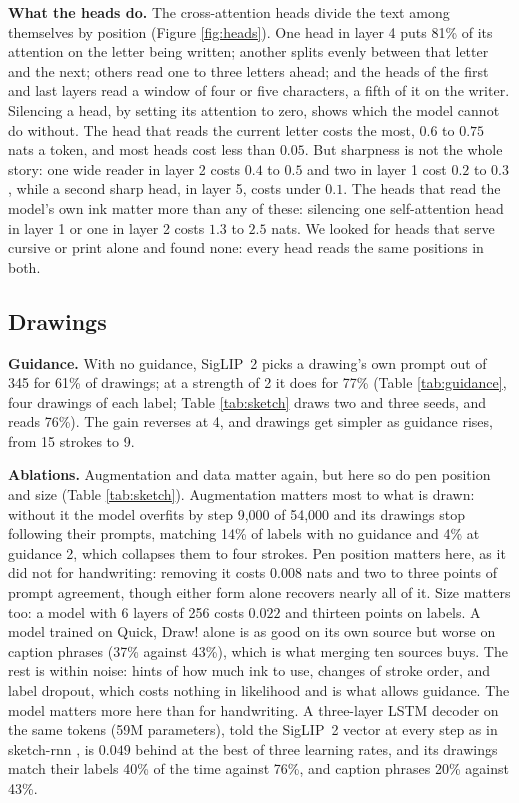 \documentclass{article}
\begin{document}
\textbf{What the heads do.} The cross-attention heads divide the text among themselves by position (Figure \ref{fig:heads}). One head in layer 4 puts 81\% of its attention on the letter being written; another splits evenly between that letter and the next; others read one to three letters ahead; and the heads of the first and last layers read a window of four or five characters, a fifth of it on the writer. Silencing a head, by setting its attention to zero, shows which the model cannot do without. The head that reads the current letter costs the most, $0.6$ to $0.75$ nats a token, and most heads cost less than $0.05$. But sharpness is not the whole story: one wide reader in layer 2 costs $0.4$ to $0.5$ and two in layer 1 cost $0.2$ to $0.3$, while a second sharp head, in layer 5, costs under $0.1$. The heads that read the model's own ink matter more than any of these: silencing one self-attention head in layer 1 or one in layer 2 costs $1.3$ to $2.5$ nats. We looked for heads that serve cursive or print alone and found none: every head reads the same positions in both.

\subsection{Drawings}

\textbf{Guidance.} With no guidance, SigLIP~2 picks a drawing's own prompt out of 345 for 61\% of drawings; at a strength of 2 it does for 77\% (Table \ref{tab:guidance}, four drawings of each label; Table \ref{tab:sketch} draws two and three seeds, and reads 76\%). The gain reverses at 4, and drawings get simpler as guidance rises, from 15 strokes to 9.

\textbf{Ablations.} Augmentation and data matter again, but here so do pen position and size (Table \ref{tab:sketch}). Augmentation matters most to what is drawn: without it the model overfits by step 9,000 of 54,000 and its drawings stop following their prompts, matching 14\% of labels with no guidance and 4\% at guidance 2, which collapses them to four strokes. Pen position matters here, as it did not for handwriting: removing it costs $0.008$ nats and two to three points of prompt agreement, though either form alone recovers nearly all of it. Size matters too: a model with 6 layers of 256 costs $0.022$ and thirteen points on labels. A model trained on Quick, Draw! alone is as good on its own source but worse on caption phrases (37\% against 43\%), which is what merging ten sources buys. The rest is within noise: hints of how much ink to use, changes of stroke order, and label dropout, which costs nothing in likelihood and is what allows guidance. The model matters more here than for handwriting. A three-layer LSTM decoder on the same tokens (59M parameters), told the SigLIP~2 vector at every step as in sketch-rnn \citep{ha2018neural}, is $0.049$ behind at the best of three learning rates, and its drawings match their labels 40\% of the time against 76\%, and caption phrases 20\% against 43\%.
\end{document}
